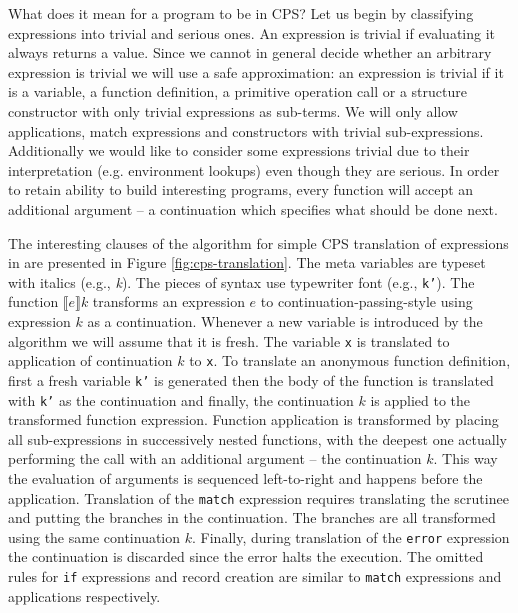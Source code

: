 What does it mean for a program to be in CPS?
Let us begin by classifying expressions into trivial and serious ones.
An expression is trivial if evaluating it always returns a value.
Since we cannot in general decide whether an arbitrary expression is trivial we will use a safe approximation: an expression is trivial if it is a variable, a function definition, a primitive operation call or a structure constructor with only trivial expressions as sub-terms.
We will only allow applications, match expressions and constructors with trivial sub-expressions.
Additionally we would like to consider some expressions trivial due to their interpretation (e.g. environment lookups) even though they are serious.
In order to retain ability to build interesting programs, every function will accept an additional argument -- a continuation which specifies what should be done next.

The interesting clauses of the algorithm for simple CPS translation of expressions in \IDL{} are presented in Figure \ref{fig:cps-translation}.
The meta variables are typeset with italics (e.g., \textit{k}).
The pieces of syntax use typewriter font (e.g., \texttt{k'}).
The function $ \llbracket e \rrbracket k $ transforms an expression $e$ to continuation-passing-style using expression $k$ as a continuation.
Whenever a new variable is introduced by the algorithm we will assume that it is fresh.
The variable \texttt{x} is translated to application of continuation $k$ to \texttt{x}.
To translate an anonymous function definition, first a fresh variable \texttt{k'} is generated then the body of the function is translated with \texttt{k'} as the continuation and finally, the continuation $k$ is applied to the transformed function expression.
Function application is transformed by placing all sub-expressions in successively nested functions, with the deepest one actually performing the call with an additional argument -- the continuation $k$.
This way the evaluation of arguments is sequenced left-to-right and happens before the application.
Translation of the \texttt{match} expression requires translating the scrutinee and putting the branches in the continuation. The branches are all transformed using the same continuation $k$.
Finally, during translation of the \texttt{error} expression the continuation is discarded since the error halts the execution.
The omitted rules for \texttt{if} expressions and record creation are similar to \texttt{match} expressions and applications respectively.

